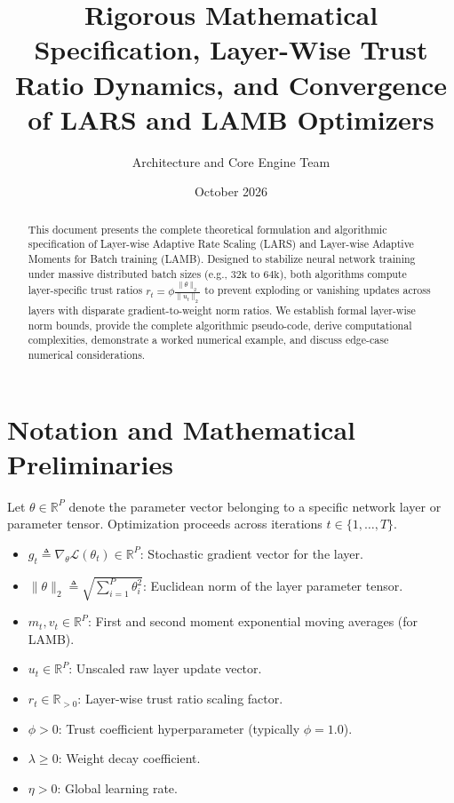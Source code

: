 \documentclass[11pt,a4paper]{article}
\title{\textbf{Rigorous Mathematical Specification, Layer-Wise Trust Ratio Dynamics, and Convergence of LARS and LAMB Optimizers}}
\author{Architecture and Core Engine Team}
\date{October 2026}
\theoremstyle{definition}
\begin{document}
\maketitle

\begin{abstract}
This document presents the complete theoretical formulation and algorithmic specification of Layer-wise Adaptive Rate Scaling (LARS) and Layer-wise Adaptive Moments for Batch training (LAMB). Designed to stabilize neural network training under massive distributed batch sizes (e.g., $32\text{k}$ to $64\text{k}$), both algorithms compute layer-specific trust ratios $r_t = \phi \frac{\|\theta\|_2}{\|u_t\|_2}$ to prevent exploding or vanishing updates across layers with disparate gradient-to-weight norm ratios. We establish formal layer-wise norm bounds, provide the complete algorithmic pseudo-code, derive computational complexities, demonstrate a worked numerical example, and discuss edge-case numerical considerations.
\end{abstract}

\section{Notation and Mathematical Preliminaries}

Let $\theta \in \mathbb{R}^P$ denote the parameter vector belonging to a specific network layer or parameter tensor. Optimization proceeds across iterations $t \in \{1, \dots, T\}$.

\begin{itemize}
    \item $g_t \triangleq \nabla_\theta \mathcal{L}(\theta_t) \in \mathbb{R}^P$: Stochastic gradient vector for the layer.
    \item $\|\theta\|_2 \triangleq \sqrt{\sum_{i=1}^P \theta_i^2}$: Euclidean norm of the layer parameter tensor.
    \item $m_t, v_t \in \mathbb{R}^P$: First and second moment exponential moving averages (for LAMB).
    \item $u_t \in \mathbb{R}^P$: Unscaled raw layer update vector.
    \item $r_t \in \mathbb{R}_{> 0}$: Layer-wise trust ratio scaling factor.
    \item $\phi > 0$: Trust coefficient hyperparameter (typically $\phi = 1.0$).
    \item $\lambda \ge 0$: Weight decay coefficient.
    \item $\eta > 0$: Global learning rate.
\end{itemize}
\end{document}
